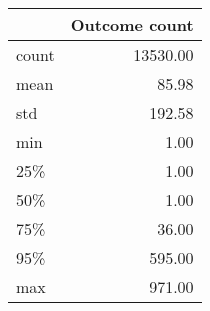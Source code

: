 \begin{tabular}{lr}
\toprule
{} &  Outcome count \\
\midrule
count &       13530.00 \\
mean  &          85.98 \\
std   &         192.58 \\
min   &           1.00 \\
25\%   &           1.00 \\
50\%   &           1.00 \\
75\%   &          36.00 \\
95\%   &         595.00 \\
max   &         971.00 \\
\bottomrule
\end{tabular}

